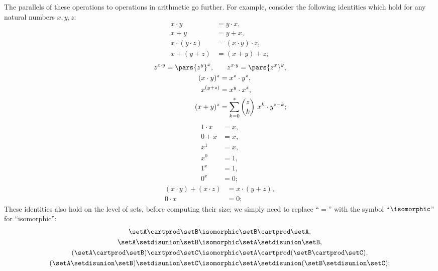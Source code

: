 The parallels of these operations to operations in arithmetic go further.
For example, consider the following identities which hold for any natural numbers $x, y, z$:
\begin{align}\label{eq:arithmetic-equations-1}
    x \cdot y           & = y \cdot x, \\
    x + y               & = y + x, \\
    x \cdot (y \cdot z) & = (x \cdot y) \cdot z, \\
    x + (y + z)         & = (x + y) + z;
\end{align}
\begin{align}\label{eq:arithmetic-equations-2}
    z^{x \cdot y} = \pars{z^y}^x, \quad & \quad  z^{x \cdot y}  = \pars{z^x}^y, \\
    (x \cdot y)^z                       & = x^z \cdot y^z, \\
    x^{(y + z)}                         & = x^y \cdot x^z, \\
    (x + y)^z                           & = \sum_{k = 0}^z {{z}\choose{k}} \ x^k \cdot y^{z - k};
\end{align}
\begin{align}\label{eq:arithmetic-equations-3}
    1 \cdot x & = x, \\
    0 + x     & = x, \\
    x^1       & = x, \\
    x^0       & = 1, \\
    1^x       & = 1, \\
    0^x       & = 0;
\end{align}
\begin{align}\label{eq:arithmetic-equations-4}
    (x \cdot y) + (x \cdot z) & = x \cdot (y + z), \\
    0 \cdot x                 & = 0;
\end{align}
These identities also hold on the level of sets, before computing their size; we simply need to replace ``$=$'' with the symbol ``$\isomorphic$'' for ``isomorphic'':
\begin{align}\label{eq:arithmetic-with-sets-1}
    \setA \cartprod \setB                         & \isomorphic \setB \cartprod \setA, \\
    \setA \setdisunion \setB                      & \isomorphic \setA \setdisunion \setB, \\
    (\setA \cartprod \setB) \cartprod \setC       & \isomorphic \setA \cartprod (\setB \cartprod \setC), \\
    (\setA \setdisunion \setB) \setdisunion \setC & \isomorphic \setA \setdisunion (\setB \setdisunion \setC);
\end{align}
